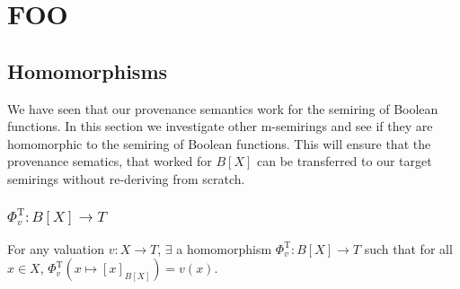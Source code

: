 \section{FOO}
\subsection{Homomorphisms}
We have seen that our provenance semantics work for 
the semiring of Boolean functions. In this section we investigate other m-semirings and see if they are homomorphic 
to the semiring of Boolean functions. This will ensure that the provenance sematics, that worked for $B[X]$ can be transferred to 
our target semirings without re-deriving from scratch.


\subsubsection{$\Phi^{\mathrm{T}}_v : B[X] \to T$}
For any valuation $v:X \to T$,  $\exists$ a homomorphism $\Phi^{\mathrm{T}}_v : B[X] \to T$ such that for all $x\in X$, 
$\Phi^{\mathrm{T}}_v(x\mapsto [x]_{B[X]})=v(x)$.

